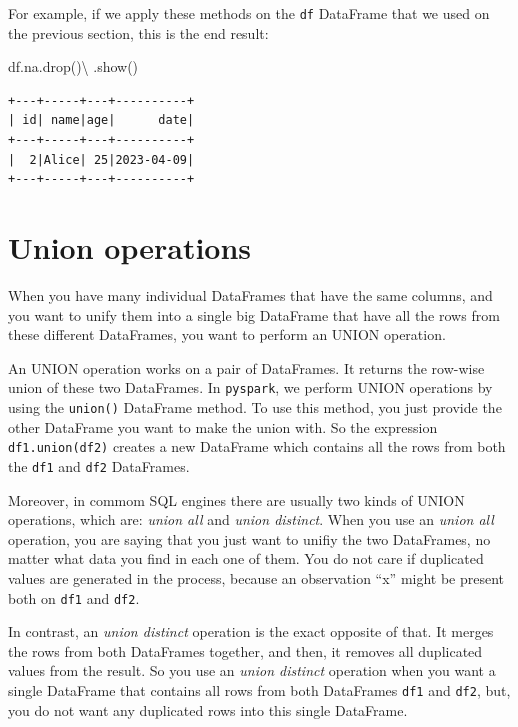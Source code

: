 \documentclass[
  11pt,
  letterpaper,
  DIV=11,
  numbers=noendperiod]{scrreprt}
\newenvironment{Shaded}{\begin{snugshade}}{\end{snugshade}}
\newcommand{\NormalTok}[1]{\textcolor[rgb]{0.00,0.23,0.31}{#1}}
\newcommand{\OperatorTok}[1]{\textcolor[rgb]{0.37,0.37,0.37}{#1}}
\begin{document}
For example, if we apply these methods on the \texttt{df} DataFrame that
we used on the previous section, this is the end result:

\begin{Shaded}
\begin{Highlighting}[]
\NormalTok{df.na.drop()}\OperatorTok{\textbackslash{}}
\NormalTok{    .show()}
\end{Highlighting}
\end{Shaded}

\begin{verbatim}
+---+-----+---+----------+
| id| name|age|      date|
+---+-----+---+----------+
|  2|Alice| 25|2023-04-09|
+---+-----+---+----------+
\end{verbatim}

\section{Union operations}\label{union-operations}

When you have many individual DataFrames that have the same columns, and
you want to unify them into a single big DataFrame that have all the
rows from these different DataFrames, you want to perform an UNION
operation.

An UNION operation works on a pair of DataFrames. It returns the
row-wise union of these two DataFrames. In \texttt{pyspark}, we perform
UNION operations by using the \texttt{union()} DataFrame method. To use
this method, you just provide the other DataFrame you want to make the
union with. So the expression \texttt{df1.union(df2)} creates a new
DataFrame which contains all the rows from both the \texttt{df1} and
\texttt{df2} DataFrames.

Moreover, in commom SQL engines there are usually two kinds of UNION
operations, which are: \emph{union all} and \emph{union distinct}. When
you use an \emph{union all} operation, you are saying that you just want
to unifiy the two DataFrames, no matter what data you find in each one
of them. You do not care if duplicated values are generated in the
process, because an observation ``x'' might be present both on
\texttt{df1} and \texttt{df2}.

In contrast, an \emph{union distinct} operation is the exact opposite of
that. It merges the rows from both DataFrames together, and then, it
removes all duplicated values from the result. So you use an \emph{union
distinct} operation when you want a single DataFrame that contains all
rows from both DataFrames \texttt{df1} and \texttt{df2}, but, you do not
want any duplicated rows into this single DataFrame.
\end{document}
